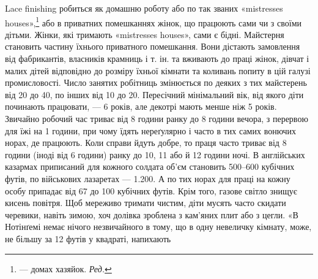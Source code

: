 Lace finishing робиться як домашню роботу або по так званих
«\textenglish{mistresses houses}»,\footnote*{
— домах хазяйок. \emph{Ред.}
} або в приватних помешканнях жінок, що
працюють сами чи з своїми дітьми. Жінки, які тримають «\textenglish{mistresses houses}», сами є бідні. Майстерня становить частину їхнього
приватного помешкання. Вони дістають замовлення від фабрикантів,
власників крамниць і т. ін. та вживають до праці жінок,
дівчат і малих дітей відповідно до розміру їхньої кімнати та коливань
попиту в цій галузі промисловості. Число занятих робітниць
змінюється по деяких з тих майстерень від 20 до 40, по інших від
10 до 20. Пересічний мінімальний вік, від якого діти починають
працювати, — 6 років, але декотрі мають менше ніж 5 років. Звичайно
робочий час триває від 8 години ранку до 8 години вечора,
з перервою для їжі на 1 години, при чому їдять нереґулярно
і часто в тих самих вонючих норах, де працюють. Коли справи
йдуть добре, то праця часто триває від 8 години (іноді від 6 години)
ранку до 10, 11 або й 12 години ночі. В англійських казармах
приписаний для кожного солдата об’єм становить 500--600 кубічних
футів, по військових лазаретах — \num{1.200}. А по тих норах
для праці на кожну особу припадає від 67 до 100 кубічних
футів. Крім того, газове світло знищує кисень повітря. Щоб
мереживо тримати чистим, діти мусять часто скидати черевики,
навіть зимою, хоч долівка зроблена з кам’яних плит або з цегли.
«В Нотінґемі немає нічого незвичайного в тому, що в одну невеличку
кімнату, може, не більшу за 12 футів у квадраті, напихають
\parbreak{}  %
